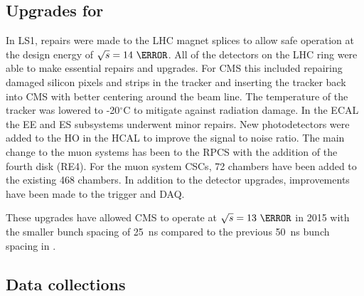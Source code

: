 \subsection{Upgrades for \runtwo}

In LS1, repairs were made to the LHC magnet splices to allow safe operation at the design energy of $\sqrt{s} = 14~\TeV$. All of the detectors on the LHC ring were able to make essential repairs and upgrades. For CMS this included repairing damaged silicon pixels and strips in the tracker and inserting the tracker back into CMS with better centering around the beam line. The temperature of the tracker was lowered to -20$^{\circ}$C to mitigate against radiation damage. In the ECAL the EE and ES subsystems underwent minor repairs. New photodetectors were added to the HO in the HCAL to improve the signal to noise ratio. The main change to the muon systems has been to the RPCS with the addition of the fourth disk (RE4). For the muon system CSCs, 72 chambers have been added to the existing 468 chambers. In addition to the detector upgrades, improvements have been made to the trigger and DAQ.

These upgrades have allowed CMS to operate at $\sqrt{s} = 13~\TeV$ in 2015 with the smaller bunch spacing of 25~ns compared to the previous 50~ns bunch spacing in \runone.

\subsection{Data collections}

